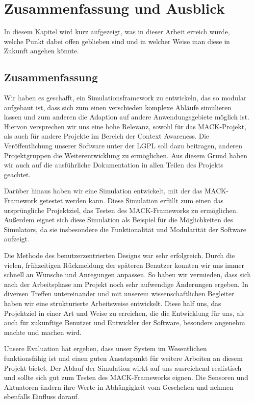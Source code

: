\chapter{Zusammenfassung und Ausblick}\label{chapter:conclusions}
In diesem Kapitel wird kurz aufgezeigt, was in dieser Arbeit erreich wurde, welche Punkt dabei offen geblieben sind und in welcher Weise man diese in Zukunft angehen könnte.
\section{Zusammenfassung}\label{sec:conc_summary}
Wir haben es geschafft, ein Simulationsframework zu entwickeln, das so modular aufgebaut ist, dass sich zum einen verschieden komplexe Abläufe simulieren lassen und zum anderen die Adaption auf andere Anwendungsgebiete möglich ist. Hiervon versprechen wir uns eine hohe Relevanz, sowohl für das MACK-Projekt, als auch für andere Projekte im Bereich der Context Awareness. Die Veröffentlichung unserer Software unter der LGPL soll dazu beitragen, anderen Projektgruppen die Weiterentwicklung zu ermöglichen. Aus diesem Grund haben wir auch auf die ausführliche Dokumentation in allen Teilen des Projekts geachtet.

Darüber hinaus haben wir eine Simulation entwickelt, mit der das MACK-Framework getestet werden kann. Diese Simulation erfüllt zum einen das ursprüngliche Projektziel, das Testen des MACK-Frameworks zu ermöglichen. Außerdem eignet sich diese Simulation als Beispiel für die Möglichkeiten des Simulators, da sie insbesondere die Funktionalität und Modularität der Software aufzeigt.

Die Methode des benutzerzentrierten Designs war sehr erfolgreich. Durch die vielen, frühzeitigen Rückmeldung der späteren Benutzer konnten wir uns immer schnell an Wünsche und Anregungen anpassen. So haben wir vermieden, dass sich nach der Arbeitsphase am Projekt noch sehr aufwendige Änderungen ergeben. 
In diversen Treffen untereinander und mit unserem wissenschaftlichen Begleiter haben wir eine strukturierte Arbeitsweise entwickelt. Diese half uns, das Projektziel in einer Art und Weise zu erreichen, die die Entwicklung für uns, als auch für zukünftige Benutzer und Entwickler der Software, besonders angenehm machte und machen wird.

Unsere Evaluation hat ergeben, dass unser System im Wesentlichen funktionsfähig ist und einen guten Ansatzpunkt für weitere Arbeiten an diesem Projekt bietet. Der Ablauf der Simulation wirkt auf uns ausreichend realistisch und sollte sich gut zum Testen des MACK-Frameworks eignen. Die Sensoren und Aktuatoren ändern ihre Werte in Abhängigkeit vom Geschehen und nehmen ebenfalls Einfluss darauf.

